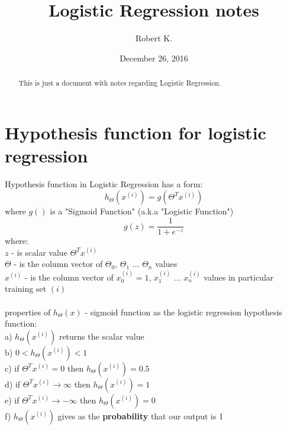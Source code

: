 \documentclass{article} %
\author{Robert K.}
\title{Logistic Regression notes}
\date{December 26, 2016}
\begin{document}
\maketitle %


\begin{abstract}
This is just a document with notes regarding Logistic Regression. 
\end{abstract} 




\section{Hypothesis function for logistic regression}\label{sec:section1}
Hypothesis function in Logistic Regression has a form:
\begin{equation}
h_{\Theta}(x^{(i)}) = g(\Theta^Tx^{(i)})
\end{equation}
\newline
where $g()$ is a "Sigmoid Function" (a.k.a "Logistic Function")
\begin{equation}
g(z) = \frac{1}{1 + e^{-z}}  
\end{equation}
\newline
where:\\
$z$ - is scalar value $\Theta^Tx^{(i)}$\\
$\Theta$ - is the column vector of $\Theta_0$, $\Theta_1$ ... $\Theta_n$ values\\
$x^{(i)}$ - is the column vector of $x^{(i)}_0=1$, $x^{(i)}_1$ ... $x^{(i)}_n$ values in particular training set $(i)$\\
\\
properties of $h_{\Theta}(x)$ - sigmoid function as the logistic regression hypothesis function:\\
a) $h_{\Theta}(x^{(i)})$ returns the scalar value\\
b) $0 < h_{\Theta}(x^{(i)}) < 1$\\
c) if $\Theta^Tx^{(i)} = 0$ then  $h_{\Theta}(x^{(i)}) = 0.5$\\
d) if $\Theta^Tx^{(i)} \rightarrow \infty$ then $h_{\Theta}(x^{(i)}) = 1$\\
e) if $\Theta^Tx^{(i)} \rightarrow -\infty$ then $h_{\Theta}(x^{(i)}) = 0$\\ 
f) $h_{\Theta}(x^{(i)})$ gives as the \textbf{probability} that our output is 1\\
\end{document}
